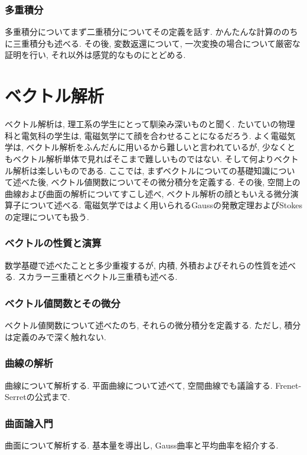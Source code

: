 \documentclass[a4j,dvipdfmx]{jsarticle}
\numberwithin{equation}{section}
\begin{document}
    \section{多重積分}
        多重積分についてまず二重積分についてその定義を話す. かんたんな計算ののちに三重積分も述べる. その後, 変数返還について, 一次変換の場合について厳密な証明を行い, 
        それ以外は感覚的なものにとどめる.
    \clearpage
    
    \part{ベクトル解析}
    \begin{screen}
        ベクトル解析は, 理工系の学生にとって馴染み深いものと聞く. たいていの物理科と電気科の学生は, 電磁気学にて顔を合わせることになるだろう.
        よく電磁気学は, ベクトル解析をふんだんに用いるから難しいと言われているが, 少なくともベクトル解析単体で見ればそこまで難しいものではない. 
        そして何よりベクトル解析は楽しいものである. ここでは, まずベクトルについての基礎知識について述べた後, ベクトル値関数についてその微分積分を定義する.
        その後, 空間上の曲線および曲面の解析についてすこし述べ, ベクトル解析の顔ともいえる微分演算子について述べる.
        電磁気学ではよく用いられるGaussの発散定理およびStokesの定理についても扱う. 
    \end{screen}
    \clearpage
    \section{ベクトルの性質と演算}
        数学基礎で述べたことと多少重複するが, 内積, 外積およびそれらの性質を述べる. スカラー三重積とベクトル三重積も述べる.
    \clearpage
    \section{ベクトル値関数とその微分}
        ベクトル値関数について述べたのち, それらの微分積分を定義する. ただし, 積分は定義のみで深く触れない.
    \clearpage
    \section{曲線の解析}
        曲線について解析する. 平面曲線について述べて, 空間曲線でも議論する. Frenet-Serretの公式まで.
    \clearpage
    \section{曲面論入門}
        曲面について解析する. 基本量を導出し, Gauss曲率と平均曲率を紹介する.
    \clearpage
\end{document}
